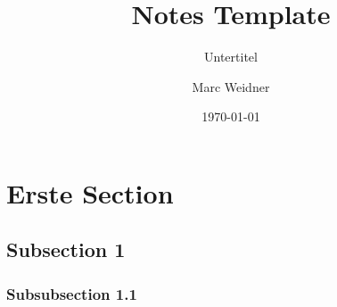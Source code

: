 \documentclass[a4paper, 12pt]{scrartcl}
\title{Notes Template}
\subtitle{Untertitel}
\author{Marc Weidner}
\date{\today}
\begin{document}
	
	\maketitle
	
	\newpage
	
	\tableofcontents
	
	\newpage
	
	\listoffigures
	
	\newpage
	
	\listoftables
	
	\newpage
	
	\section{Erste Section}
	\lipsum[1-3]
	
	\subsection{Subsection 1}
	\lipsum[4-6]
	
	\subsubsection{Subsubsection 1.1}
	\lipsum[7-9]
	
\end{document}
